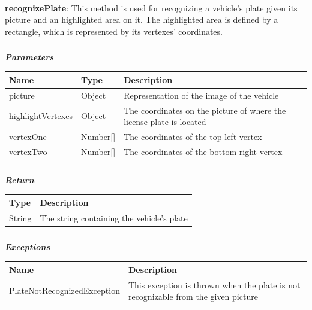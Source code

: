 					\paragraph{}
							\textbf{recognizePlate}: This method is used for recognizing a vehicle's plate given its picture and an highlighted area on it. The highlighted area is defined by a rectangle, which is represented by its vertexes' coordinates. 
							\subparagraph{}
							\vspace{-3mm}
							\textit{\textbf{Parameters}}
							\vspace{-2mm}
								\begin{table}[!h]
									\begin{tabular}{L{0.25\textwidth}L{0.2\textwidth}L{0.35\textwidth}}
										\toprule
										\textbf{Name} & \textbf{Type} & \textbf{Description} \\
										\midrule
								  		picture & Object & Representation of the image of the vehicle \\
								  		highlightVertexes & Object & The coordinates on the picture of where the license plate is located \\
								  		\hspace{2.5mm}vertexOne & Number[] & The coordinates of the \newline top-left vertex \\
								  		\hspace{2.5mm}vertexTwo & Number[] & The coordinates of the \newline bottom-right vertex \\
								 		\bottomrule
									\end{tabular}
								\end{table}
							\subparagraph{}
							\vspace{-6mm}
								\textit{\textbf{Return}}
								\vspace{-2mm}
									\begin{table}[!h]
									\begin{tabular}{L{0.15\textwidth}L{0.65\textwidth}}
										\toprule
										\textbf{Type} & \textbf{Description} \\
										\midrule
								  		String & The string containing the vehicle's plate \\
								 		\bottomrule
									\end{tabular}
								\end{table}
							\clearpage
							\subparagraph{}
								\textit{\textbf{Exceptions}}
								\vspace{-2mm}
									\begin{table}[!h]
									\begin{tabular}{lL{0.4\textwidth}}
										\toprule
										\textbf{Name} & \textbf{Description} \\
										\midrule
								  		PlateNotRecognizedException & This exception is thrown when the plate is not recognizable from the given picture \\
								 		\bottomrule
									\end{tabular}
								\end{table}
								
